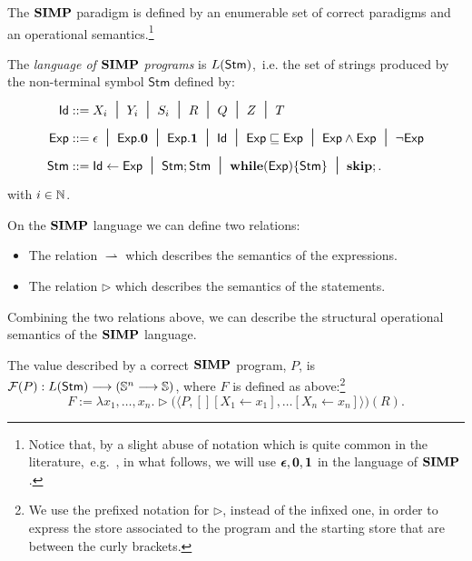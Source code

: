 The $\mathbf{SIMP}$ paradigm is defined by an enumerable
set of correct paradigms
and an operational semantics.\footnote{
{Notice
that, by a slight abuse of notation which
is quite common in the literature,~e.g.~\cite{Winskel},
in what follows, we will use $\bm{\epsilon},\mathbf{0},\mathbf{1}$
in the language of $\mathbf{SIMP}$.}}

\begin{defn}
The \emph{language of $\mathbf{SIMP}$ programs}
is $L(\mathsf{Stm})$,~i.e. the set of strings
produced by the non-terminal symbol
$\mathsf{Stm}$ defined by:
\begin{align*}
\mathsf{Id} &::= X_i \midd Y_i \midd
S_i \midd R \midd Q \midd Z \midd T \\
%
\mathsf{Exp} &::= \epsilon \midd \mathsf{Exp.\zzero}
\midd \mathsf{Exp.\oone} \midd
\mathsf{Id} \midd \mathsf{Exp} \sqsubseteq
\mathsf{Exp} \midd
\mathsf{Exp} \wedge \mathsf{Exp} \midd
\neg \mathsf{Exp} \\
%
\mathsf{Stm} &::= \mathsf{Id} \leftarrow \mathsf{Exp}
\midd \mathsf{Stm};\mathsf{Stm} \midd
\mathbf{while}(\mathsf{Exp})\{\mathsf{Stm}\}
\midd \mathbf{skip};.
\end{align*}
with $i\in \mathbb{N}$.
\end{defn}

\begin{defn}
On the $\mathbf{SIMP}$ language we can define two relations:

\begin{itemize}
\item The relation $\rightharpoonup$ which describes the
semantics of the expressions.
\item The relation $\triangleright$ which describes the
semantics of the statements.
\end{itemize}
\end{defn}

Combining the two relations above, we can describe the
structural operational semantics of the $\mathbf{SIMP}$ language.



\begin{defn}
The value described by a correct
$\mathbf{SIMP}$ program, $P$, is $\mathcal{F}(P):
{L(\mathsf{Stm})} \longrightarrow (\mathbb{S}^n
\longrightarrow \mathbb{S})$,
where $F$ is defined as above:\footnote{We use the prefixed
notation for $\triangleright$, instead of the infixed one,
in order to express the store associated to the program
and the starting store that are between the curly brackets.}
$$
F := \lambda x_1,\dots, x_n.\triangleright
\big(\langle P, [][X_1\leftarrow x_1],\dots
[X_n\leftarrow x_n]\rangle\big)(R).
$$
\end{defn}

